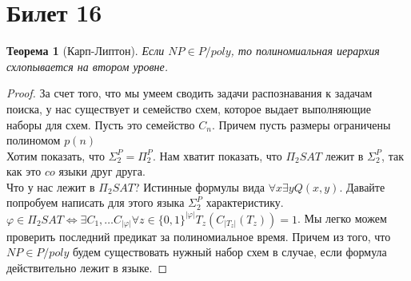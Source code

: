 \documentclass[12pt, letterpaper]{article}
\newtheorem{theorem}{Теорема}[section]
\newcommand{\ph}{\varphi}
\begin{document}
\section{Билет 16}
\begin{theorem}[Карп-Липтон]
Если $NP \in P/poly$, то полиномиальная иерархия схлопывается на втором уровне.
\end{theorem}
\begin{proof}
За счет того, что мы умеем сводить задачи распознавания к задачам поиска, у нас существует и семейство схем, которое выдает выполняющие наборы для схем. Пусть это семейство $C_n$. Причем пусть размеры ограничены полиномом $p(n)$\\
Хотим показать, что $\Sigma^P_2 = \Pi^P_2$. Нам хватит показать, что $\Pi_2 SAT$ лежит в $\Sigma^P_2$, так как это $co$ языки друг друга.\\
Что у нас лежит в $\Pi_2 SAT$? Истинные формулы вида $\forall x \exists y Q(x, y)$. Давайте попробуем написать для этого языка $\Sigma^P_2$ характеристику.\\
$\ph \in \Pi_2 SAT \Longleftrightarrow \exists C_1, \ldots C_{|\ph|} \forall z \in \{0,1\}^{|\ph|} T_{z} (C_{|T_{z}|} (T_z)) = 1 $. Мы легко можем проверить последний предикат за полиномиальное время. Причем из того, что $NP \in P/poly$ будем существовать нужный набор схем в случае, если формула действительно лежит в языке.
\end{proof}
\end{document}
